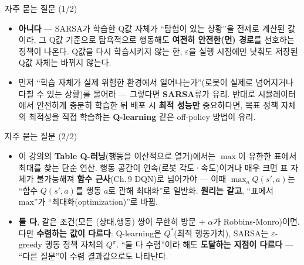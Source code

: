 \documentclass[aspectratio=169,11pt]{beamer}
\begin{document}
\begin{frame}{자주 묻는 질문 (1/2)}
  \begin{itemize}
    \item {}
      \textbf{아니다} --- SARSA가 학습한 Q값 자체가 ``탐험이 있는
      상황''을 전제로 계산된 값이라, 그 Q값 기준으로 탐욕적으로
      행동해도 \textbf{여전히 안전한(먼) 경로}를 선호하는 정책이
      나온다. Q값을 다시 학습시키지 않는 한, $\varepsilon$을 실행
      시점에만 낮춰도 저장된 Q값 자체는 바뀌지 않는다.
    \item {}
      먼저 ``학습 자체가 실제 위험한 환경에서 일어나는가''(로봇이
      실제로 넘어지거나 다칠 수 있는 상황)를 물어라 --- 그렇다면
      \textbf{SARSA}류가 유리.
      반대로 시뮬레이터에서 안전하게 충분히 학습한 뒤 배포 시
      \textbf{최적 성능만} 중요하다면, 목표 정책 자체의 최적성을
      직접 학습하는 \textbf{Q-learning} 같은 off-policy 방법이 유리.
  \end{itemize}
\end{frame}

\begin{frame}{자주 묻는 질문 (2/2)}
  \begin{itemize}
    \item {}
      이 강의의 \textbf{Table Q-러닝}(행동을 이산적으로 열거)에서는
      $\max$이 유한한 표에서 최대를 찾는 단순 연산.
      행동 공간이 연속(로봇 각도·속도)이거나 매우 크면 표 자체가
      불가능해져 \textbf{함수 근사}(Ch.\,9 DQN)로 넘어가야 ---
      이때 $\max_a Q(s',a)$는 ``함수 $Q(s',a)$를 행동 $a$로 관해
      최대화''로 일반화. \textbf{원리는 같고}, ``표에서 max''가
      ``최대화(optimization)''로 바뀜.
    \item {}
      \textbf{둘 다}, 같은 조건(모든 (상태,행동) 쌍이 무한히 방문 +
      $\alpha$가 Robbins-Monro)이면. 다만 \textbf{수렴하는 값이
      다르다}: Q-learning은 $Q^{*}$(최적 행동가치), SARSA는
      $\varepsilon$-greedy 행동 정책 자체의 $Q^{\pi}$.
      ``둘 다 수렴''이라 해도 \textbf{도달하는 지점이 다르다} ---
      ``다른 질문''이 수렴 결과값으로도 나타난다.
  \end{itemize}
\end{frame}
\end{document}

